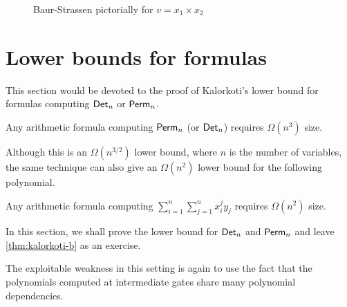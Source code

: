 \begin{figure}[h]
\begin{center}
\end{center}
\caption{Baur-Strassen pictorially for $v = x_1 \times x_2$}
\label{fig:baur-strassen}
\end{figure}


\section{Lower bounds for formulas}\label{sec:Kalorkoti}

This section would be devoted to the proof of Kalorkoti's lower bound \cite{k85} for formulas computing $\operatorname{\mathsf{Det}}_n$ or $\operatorname{\mathsf{Perm}}_n$.

\begin{theorem}[\cite{k85}]\label{thm:kalorkoti}
  Any arithmetic formula computing $\operatorname{\mathsf{Perm}}_n$ (or $\operatorname{\mathsf{Det}}_n$) requires $\Omega(n^3)$ size.
\end{theorem}

Although this is an $\Omega(n^{3/2})$ lower bound, where $n$ is the number of variables, the same technique can also give an $\Omega(n^2)$ lower bound for the following polynomial.

\begin{theorem}[\cite{k85}]\label{thm:kalorkoti-b}
  Any arithmetic formula computing $\sum_{i=1}^n \sum_{j=1}^n x_i^j y_j$ requires $\Omega(n^2)$ size.
\end{theorem}

In this section, we shall prove the lower bound for $\operatorname{\mathsf{Det}}_n$ and $\operatorname{\mathsf{Perm}}_n$ and leave \autoref{thm:kalorkoti-b} as an exercise. 

The exploitable weakness in this setting is again to use the fact that the polynomials computed at intermediate gates share many polynomial dependencies.

